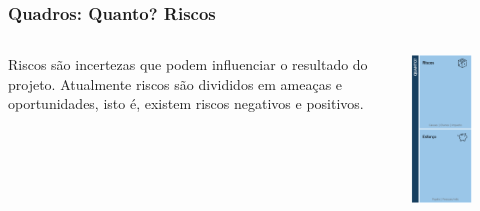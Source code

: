 \documentclass[aspectratio=169]{beamer}
\begin{document}
\begin{frame}
\frametitle{Quadros: Quanto? Riscos}
\begin{columns}
    \begin{column}{.66\textwidth}
Riscos são incertezas que podem influenciar o resultado do projeto. Atualmente riscos são divididos em ameaças e oportunidades, isto é, existem riscos negativos e positivos.
    \end{column}
    \begin{column}{.33\textwidth}
            \centering
    \includegraphics[width=0.6\textwidth]{detalhes/quanto.png}
    \end{column}
\end{columns} 
\end{frame}
\end{document}
